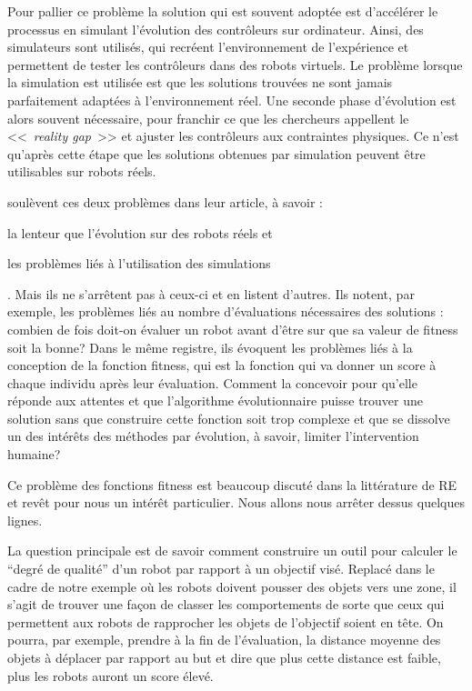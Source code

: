 Pour pallier ce problème la solution qui est souvent adoptée est d'accélérer le processus en simulant l'évolution des contrôleurs sur ordinateur. Ainsi, des simulateurs sont utilisés, qui recréent l'environnement de l'expérience et permettent de tester les contrôleurs dans des robots virtuels. Le problème lorsque la simulation est utilisée est que les solutions trouvées ne sont jamais parfaitement adaptées à l'environnement réel. Une seconde phase d'évolution est alors souvent nécessaire, pour franchir ce que les chercheurs appellent le <<~\emph{reality gap}~>> et ajuster les contrôleurs aux contraintes physiques. Ce n'est qu'après cette étape que les solutions obtenues par simulation peuvent être utilisables sur robots réels.

\cite{mataric96challengesinevolvingcontrollersforphysicalrobots} soulèvent ces deux problèmes dans leur article, à savoir :
\begin{inparaenum}
\item la lenteur que l'évolution sur des robots réels et
\item les problèmes liés à l'utilisation des simulations
\end{inparaenum}. Mais ils ne s'arrêtent pas à ceux-ci et en listent d'autres. Ils notent, par exemple, les problèmes liés au nombre d'évaluations nécessaires des solutions : combien de fois doit-on évaluer un robot avant d'être sur que sa valeur de fitness soit la bonne? Dans le même registre, ils évoquent les problèmes liés à la conception de la fonction fitness, qui est la fonction qui va donner un score à chaque individu après leur évaluation. Comment la concevoir pour qu'elle réponde aux attentes et que l'algorithme évolutionnaire puisse trouver une solution sans que construire cette fonction soit trop complexe et que se dissolve un des intérêts des méthodes par évolution, à savoir, limiter l'intervention humaine?

Ce problème des fonctions fitness est beaucoup discuté dans la littérature de RE et revêt pour nous un intérêt particulier. Nous allons nous arrêter dessus quelques lignes.

La question principale est de savoir comment construire un outil pour calculer le ``degré de qualité'' d'un robot par rapport à un objectif visé. Replacé dans le cadre de notre exemple où les robots doivent pousser des objets vers une zone, il s'agit de trouver une façon de classer les comportements de sorte que ceux qui permettent aux robots de rapprocher les objets de l'objectif soient en tête. On pourra, par exemple, prendre à la fin de l'évaluation, la distance moyenne des objets à déplacer par rapport au but et dire que plus cette distance est faible, plus les robots auront un score élevé.

